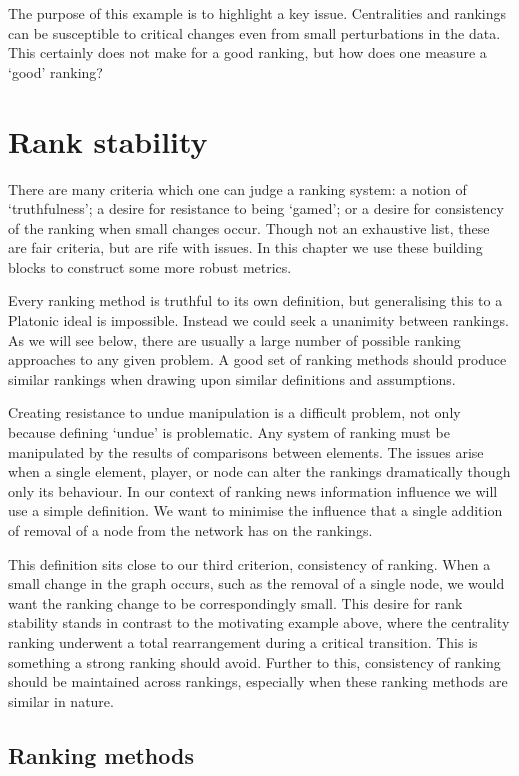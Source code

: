 The purpose of this example is to highlight a key issue. Centralities and rankings can be susceptible to critical changes even from small perturbations in the data. This certainly does not make for a good ranking, but how does one measure a `good' ranking?


\section{Rank stability}

There are many criteria which one can judge a ranking system: a notion of `truthfulness'; a desire for resistance to being `gamed'; or a desire for consistency of the ranking when small changes occur. Though not an exhaustive list, these are fair criteria, but are rife with issues. In this chapter we use these building blocks to construct some more robust metrics.

Every ranking method is truthful to its own definition, but generalising this to a Platonic ideal is impossible. Instead we could seek a unanimity between rankings. As we will see below, there are usually a large number of possible ranking approaches to any given problem. A good set of ranking methods should produce similar rankings when drawing upon similar definitions and assumptions.

Creating resistance to undue manipulation is a difficult problem, not only because defining `undue' is problematic. Any system of ranking must be manipulated by the results of comparisons between elements. The issues arise when a single element, player, or node can alter the rankings dramatically though only its behaviour. In our context of ranking news information influence we will use a simple definition. We want to minimise the influence that a single addition of removal of a node from the network has on the rankings.

This definition sits close to our third criterion, consistency of ranking. When a small change in the graph occurs, such as the removal of a single node, we would want the ranking change to be correspondingly small. This desire for rank stability stands in contrast to the motivating example above, where the centrality ranking underwent a total rearrangement during a critical transition. This is something a strong ranking should avoid. Further to this, consistency of ranking should be maintained across rankings, especially when these ranking methods are similar in nature. 


\subsection{Ranking methods}

